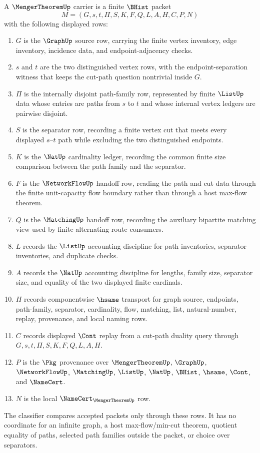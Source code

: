 \begin{definition}
\label{def:menger-theorem-carrier}
A $\MengerTheoremUp$ carrier is a finite $\BHist$ packet
$$
M=(G,s,t,\Pi,S,K,F,Q,L,A,H,C,P,N)
$$
with the following displayed rows:
\begin{enumerate}
\item $G$ is the $\GraphUp$ source row, carrying the finite vertex inventory, edge inventory, incidence data, and endpoint-adjacency checks.
\item $s$ and $t$ are the two distinguished vertex rows, with the endpoint-separation witness that keeps the cut-path question nontrivial inside $G$.
\item $\Pi$ is the internally disjoint path-family row, represented by finite $\ListUp$ data whose entries are paths from $s$ to $t$ and whose internal vertex ledgers are pairwise disjoint.
\item $S$ is the separator row, recording a finite vertex cut that meets every displayed $s$--$t$ path while excluding the two distinguished endpoints.
\item $K$ is the $\NatUp$ cardinality ledger, recording the common finite size comparison between the path family and the separator.
\item $F$ is the $\NetworkFlowUp$ handoff row, reading the path and cut data through the finite unit-capacity flow boundary rather than through a host max-flow theorem.
\item $Q$ is the $\MatchingUp$ handoff row, recording the auxiliary bipartite matching view used by finite alternating-route consumers.
\item $L$ records the $\ListUp$ accounting discipline for path inventories, separator inventories, and duplicate checks.
\item $A$ records the $\NatUp$ accounting discipline for lengths, family size, separator size, and equality of the two displayed finite cardinals.
\item $H$ records componentwise $\hsame$ transport for graph source, endpoints, path-family, separator, cardinality, flow, matching, list, natural-number, replay, provenance, and local naming rows.
\item $C$ records displayed $\Cont$ replay from a cut-path duality query through $G,s,t,\Pi,S,K,F,Q,L,A,H$.
\item $P$ is the $\Pkg$ provenance over $\MengerTheoremUp$, $\GraphUp$, $\NetworkFlowUp$, $\MatchingUp$, $\ListUp$, $\NatUp$, $\BHist$, $\hsame$, $\Cont$, and $\NameCert$.
\item $N$ is the local $\NameCert_{\MengerTheoremUp}$ row.
\end{enumerate}
The classifier compares accepted packets only through these rows. It has no coordinate for an infinite graph, a host max-flow/min-cut theorem, quotient equality of paths, selected path families outside the packet, or choice over separators.
\end{definition}

